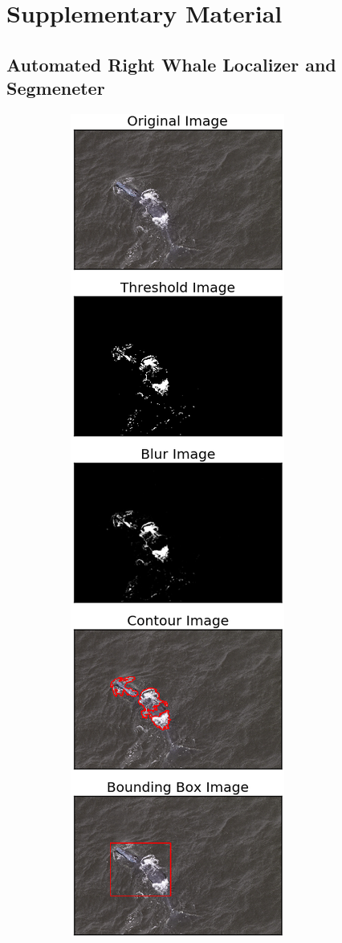 \appendix
\section{Supplementary Material}


\subsection{Automated Right Whale Localizer and Segmeneter}
\label{sup:auto_croping}

\begin{figure}[H]
	\centering
	\begin{subfigure}[b]{0.25\linewidth}
		\includegraphics[width=\linewidth]{sections/imgs/preprocessing/figure_1.png}

\end{subfigure}
\end{figure}
